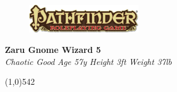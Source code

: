 \documentclass[letterpaper]{article}
\newcommand{\fullline}{\noindent\line(1,0){542} \\}
\begin{document}
\sffamily
\begin{figure}
\vspace{-1.5em}
\includegraphics[width=13em]{Pathfinder}
\end{figure}
\noindent \textbf{\huge{Zaru }\Large{Gnome Wizard 5}} \\
\emph{Chaotic Good} \hspace{2em} \emph{Age 57y} \hspace{2em} \emph{Height 3ft} \hspace{2em} \emph{Weight 37lb} \par
\vspace{-0.75em}

\fullline
\end{document}
